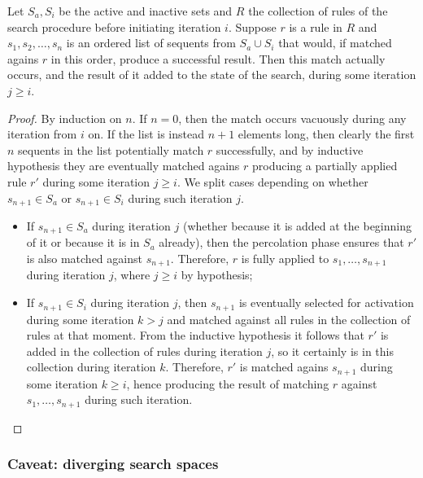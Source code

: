 \begin{theorem}
  Let $S_a, S_i$ be the active and inactive sets and $R$ the collection of rules
  of the search procedure before initiating iteration $i$. Suppose $r$ is a rule
  in $R$ and $s_1, s_2, \dots, s_n$ is an ordered list of sequents from
  $S_a \cup S_i$ that would, if matched agains $r$ in this order, produce a
  successful result. Then this match actually occurs, and the result of it added
  to the state of the search, during some iteration $j \geq i$.
\end{theorem}
\begin{proof}
  By induction on $n$. If $n = 0$, then the match occurs vacuously during any
  iteration from $i$ on. If the list is instead $n+1$ elements long, then
  clearly the first $n$ sequents in the list potentially match $r$ successfully,
  and by inductive hypothesis they are eventually matched agains $r$ producing a
  partially applied rule $r'$ during some iteration $j \geq i$. We split cases
  depending on whether $s_{n+1} \in S_a$ or $s_{n+1} \in S_i$ during such
  iteration $j$.

  \begin{itemize}
  \item If $s_{n+1} \in S_a$ during iteration $j$ (whether because it is added
    at the beginning of it or because it is in $S_a$ already), then the
    percolation phase ensures that $r'$ is also matched against
    $s_{n+1}$. Therefore, $r$ is fully applied to $s_1, \dots, s_{n+1}$ during
    iteration $j$, where $j \geq i$ by hypothesis;

  \item If $s_{n+1} \in S_i$ during iteration $j$, then $s_{n+1}$ is eventually
    selected for activation during some iteration $k > j$ and matched against
    all rules in the collection of rules at that moment. From the inductive
    hypothesis it follows that $r'$ is added in the collection of rules during
    iteration $j$, so it certainly is in this collection during iteration
    $k$. Therefore, $r'$ is matched agains $s_{n+1}$ during some iteration
    $k \geq i$, hence producing the result of matching $r$ against
    $s_1, \dots, s_{n+1}$ during such iteration.
  \end{itemize}
\end{proof}

\subsubsection{Caveat: diverging search spaces}

